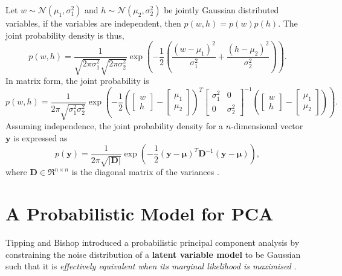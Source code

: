 \documentclass[ %
author={Dillon Keith Diep},
supervisor={Dr. Carl Henrik Ek},
degree={MEng},
title={ART-CG:},
subtitle={Assisted Real-time Content Generation of 3D Hair by Learning Manifolds},
type={Research},
year={2017} ]{dissertation}
\begin{document}
Let $w\sim\mathcal{N}(\mu_1, \sigma^2_1)$ and $h\sim\mathcal{N}(\mu_2, \sigma^2_2)$ be jointly Gaussian distributed variables, if the variables are independent, then $p(w,h)=p(w)p(h)$.
The joint probability density is thus,
$$p(w,h)=\frac{1}{\sqrt{2\pi\sigma^2_1}\sqrt{2\pi\sigma^2_2}}
\exp\left(-\frac{1}{2}\left(\frac{(w-\mu_1)^2}{\sigma^2_1}+\frac{(h-\mu_2)^2}{\sigma^2_2}\right)\right).$$
In matrix form, the joint probability is
$$p(w,h)=\frac{1}{2\pi\sqrt{\sigma^2_1\sigma^2_2}}\exp
\left(
-\frac{1}{2}
\left(
\left[
\begin{matrix}
w \\
h
\end{matrix}
\right]
-
\left[
\begin{matrix}
\mu_1 \\
\mu_2
\end{matrix}
\right]
\right)^T
\left[
\begin{matrix}
\sigma^2_1  &   0\\
0           &   \sigma^2_2
\end{matrix}
\right]^{-1}
\left(
\left[
\begin{matrix}
w \\
h
\end{matrix}
\right]
-
\left[
\begin{matrix}
\mu_1 \\
\mu_2
\end{matrix}
\right]
\right)
\right).$$
Assuming independence, the joint probability density for a $n$-dimensional vector $\bm{y}$ is expressed as
\begin{equation} \label{jointpd}
p(\bm{y})=\frac{1}{2\pi\sqrt{|\bm{D}|}}\exp\left(-\frac{1}{2}(\bm{y}-\bm{\mu})^T\bm{D}^{-1}(\bm{y}-\bm{\mu})\right),
\end{equation}
where $\bm{D}\in\Re^{n \times n}$ is the diagonal matrix of the variances \cite[p.78]{bishop}.

\section{A Probabilistic Model for PCA}
Tipping and Bishop introduced a probabilistic principal component analysis by constraining the noise distribution of a \textbf{latent variable model} to be Gaussian such that it is \textit{effectively equivalent when its marginal likelihood is maximised} \cite{ppca}.
\end{document}
